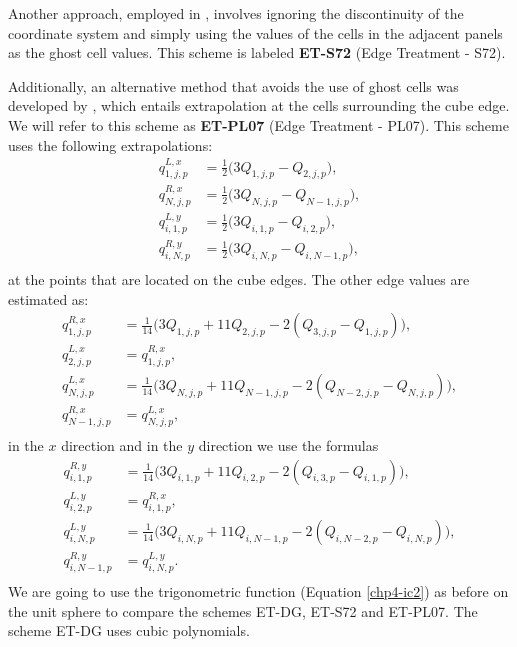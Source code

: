 Another approach, employed in \citet{sadourny:1972}, involves ignoring the
discontinuity of the coordinate system and simply using the values of the cells 
in the adjacent panels as the ghost cell values. This scheme is labeled \textbf{ET-S72} (Edge Treatment - S72).

Additionally, an alternative method that avoids the use of ghost cells was developed by
\citet{putman:2007}, which entails extrapolation at the cells surrounding the cube edge.
We will refer to this scheme as \textbf{ET-PL07} (Edge Treatment - PL07).
This scheme uses the following extrapolations:
\begin{align*}
	q^{L,x}_{1,j,p} &= \frac{1}{2}\bigg(3Q_{1,j,p} - Q_{2,j,p}\bigg),\\
	q^{R,x}_{N,j,p} &= \frac{1}{2}\bigg(3Q_{N,j,p} - Q_{N-1,j,p}\bigg),\\
	q^{L,y}_{i,1,p} &= \frac{1}{2}\bigg(3Q_{i,1,p} - Q_{i,2,p}\bigg),\\
	q^{R,y}_{i,N,p} &= \frac{1}{2}\bigg(3Q_{i,N,p} - Q_{i,N-1,p}\bigg),\\
\end{align*}
at the points that are located on the cube edges. The other edge values are estimated as:
\begin{align*}
	q^{R,x}_{1,j,p} &= \frac{1}{14}\bigg(3Q_{1,j,p} + 11Q_{2,j,p} - 2(Q_{3,j,p} - Q_{1,j,p})\bigg),\\
	q^{L,x}_{2,j,p} &= q^{R,x}_{1,j,p},\\
	q^{L,x}_{N,j,p} &= \frac{1}{14}\bigg(3Q_{N,j,p} + 11Q_{N-1,j,p} - 2(Q_{N-2,j,p} - Q_{N,j,p})\bigg),\\
	q^{R,x}_{N-1,j,p} &= q^{L,x}_{N,j,p},\\
\end{align*}
in the $x$ direction and in the $y$ direction we use the formulas
\begin{align*}
	q^{R,y}_{i,1,p} &= \frac{1}{14}\bigg(3Q_{i,1,p} + 11Q_{i,2,p} - 2(Q_{i,3,p} - Q_{i,1,p})\bigg),\\
	q^{L,y}_{i,2,p} &= q^{R,x}_{i,1,p},\\
	q^{L,y}_{i,N,p} &= \frac{1}{14}\bigg(3Q_{i,N,p} + 11Q_{i,N-1,p} - 2(Q_{i,N-2,p} - Q_{i,N,p})\bigg),\\
	q^{R,y}_{i,N-1,p} &= q^{L,y}_{i,N,p}.\\
\end{align*}
We are going to use the trigonometric function (Equation \eqref{chp4-ic2})
as before on the unit sphere to compare the schemes ET-DG, ET-S72 and ET-PL07. The scheme ET-DG uses cubic polynomials.
